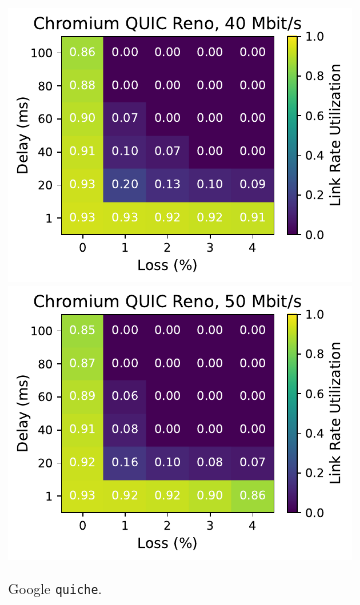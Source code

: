 \begin{figure}[ht]
\begin{subfigure}[b]{0.22\linewidth}
        \includegraphics[width=\linewidth,trim={0 0 2cm 0},clip]{splitting/figures/heatmaps/heatmap_quic_reno_40mbps.pdf}
        \includegraphics[width=\linewidth,trim={0 0 2cm 0},clip]{splitting/figures/heatmaps/heatmap_quic_reno_50mbps.pdf}
        \caption{Google \texttt{quiche}.}
    \end{subfigure}
    \begin{subfigure}[b]{0.22\linewidth}

\end{subfigure}
\end{figure}
